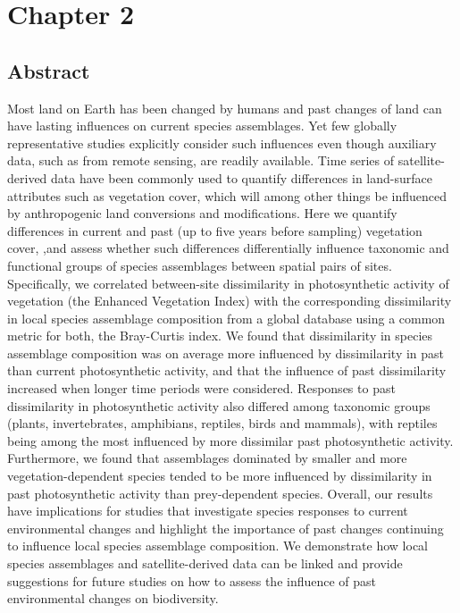 \chapter{Chapter 2}

\section{Abstract}
Most land on Earth has been changed by humans and past changes of land can have lasting influences on current species assemblages. Yet few globally representative studies explicitly consider such influences even though auxiliary data, such as from remote sensing, are readily available. Time series of satellite-derived data have been commonly used to quantify differences in land-surface attributes such as vegetation cover, which will among other things be influenced by anthropogenic land conversions and modifications. Here we quantify differences in current and past (up to five years before sampling) vegetation cover, ,and assess whether such differences differentially influence taxonomic and functional groups of species assemblages between spatial pairs of sites. Specifically, we correlated between-site dissimilarity in photosynthetic activity of vegetation (the Enhanced Vegetation Index) with the corresponding dissimilarity in local species assemblage composition from a global database using a common metric for both, the Bray-Curtis index. We found that dissimilarity in species assemblage composition was on average more influenced by dissimilarity in past than current photosynthetic activity, and that the influence of past dissimilarity increased when longer time periods were considered. Responses to past dissimilarity in photosynthetic activity also differed among taxonomic groups (plants, invertebrates, amphibians, reptiles, birds and mammals), with reptiles being among the most influenced by more dissimilar past photosynthetic activity. Furthermore, we found that assemblages dominated by smaller and more vegetation-dependent species tended to be more influenced by dissimilarity in past photosynthetic activity than prey-dependent species. Overall, our results have implications for studies that investigate species responses to current environmental changes and highlight the importance of past changes continuing to influence local species assemblage composition. We demonstrate how local species assemblages and satellite-derived data can be linked and provide suggestions for future studies on how to assess the influence of past environmental changes on biodiversity.

